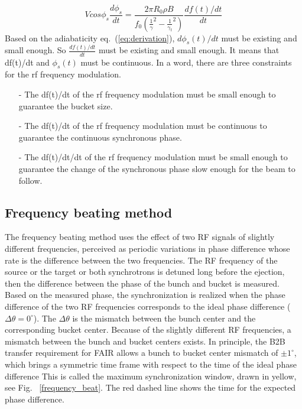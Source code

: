 \begin{itemize}
\begin{equation}
Vcos\phi_s\frac{d\phi_s}{dt}=\frac{2\pi R_0 \rho B}{f_0(\frac{1}{\gamma}^2-\frac{1}{\gamma_t}^2)}\frac{df(t)/dt}{dt} 
\label{eq:2dotf}
\end{equation}
\label{3_criteria}
Based on the adiabaticity eq.~(\ref{eq:derivation}), $d\phi_s(t)/ dt$ must be existing and small enough. So $\frac{df(t)/dt}{dt}$ must be existing and small enough. It means that df(t)/dt and $\phi_s(t)$ must be continuous. In a word, there are three constraints for the rf frequency modulation.
\begin{itemize}
\item[-] The df(t)/dt of the rf frequency modulation must be small enough to guarantee the bucket size.
\item[-] The df(t)/dt of the rf frequency modulation must be continuous to guarantee the continuous synchronous phase.
\item[-] The df(t)/dt/dt of the rf frequency modulation must be small enough to guarantee the change of the synchronous phase slow enough for the beam to follow.
\end{itemize}

\end{itemize}

\subsection{Frequency beating method}

The frequency beating method uses the effect of two RF signals of slightly different frequencies, perceived as periodic variations in phase difference whose rate is the difference between the two frequencies. The RF frequency of the source or the target or both synchrotrons is detuned long before the ejection, then the difference between the phase of the bunch and bucket is measured. Based on the measured phase, the synchronization is realized when the phase difference of the two RF frequencies corresponds to the ideal phase difference ($\Delta \theta = 0^\circ$). The $\Delta \theta$ is the mismatch between the bunch center and the corresponding bucket center. Because of the slightly different RF frequencies, a mismatch between the bunch and bucket centers exists. In principle, the B2B transfer requirement for FAIR allows a bunch to bucket center mismatch of $\pm1^\circ$, which brings a symmetric time frame with respect to the time of the ideal phase difference This is called the maximum synchronization window, drawn in yellow, see Fig. ~\ref{frequency_beat}. The red dashed line shows the time for the expected phase difference.

